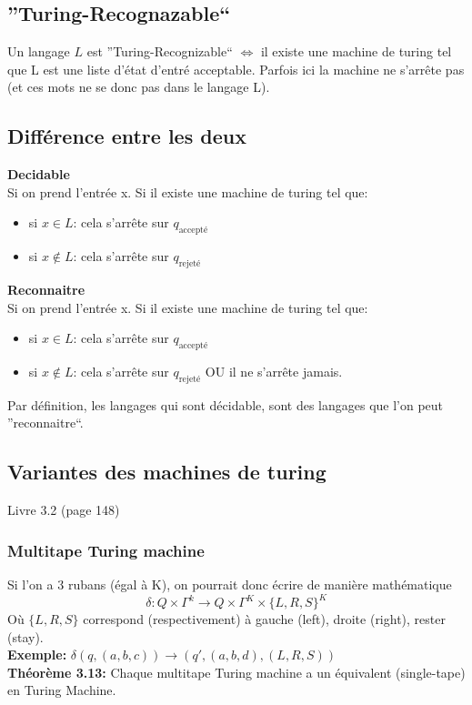 \documentclass[a4paper,12pt]{article}
\begin{document}
  \subsection{''Turing-Recognazable``}
    Un langage $L$ est ''Turing-Recognizable`` $\Leftrightarrow$ il existe une machine de turing tel que L est une liste d'état d'entré acceptable.  Parfois ici la machine ne s'arrête pas (et ces mots ne se donc pas dans le langage L).
    
  \subsection{Différence entre les deux}
    \textbf{Decidable}\\
    Si on prend l'entrée x.  Si il existe une machine de turing tel que:
    \begin{itemize}
      \item si $x \in L$:  cela s'arrête sur $q_{\text{accepté}}$
      \item si $x \notin L$:  cela s'arrête sur $q_{\text{rejeté}}$
    \end{itemize}

    \textbf{Reconnaitre}\\
    Si on prend l'entrée x.  Si il existe une machine de turing tel que:
    \begin{itemize}
      \item si $x \in L$:  cela s'arrête sur $q_{\text{accepté}}$
      \item si $x \notin L$:  cela s'arrête sur $q_{\text{rejeté}}$ OU il ne s'arrête jamais.
    \end{itemize}
    Par définition, les langages qui sont décidable, sont des langages que l'on peut ''reconnaitre``.
  
  \subsection{Variantes des machines de turing}
    Livre 3.2 (page 148)
  
    \subsubsection{Multitape Turing machine}
      Si l'on a 3 rubans (égal à K), on pourrait donc écrire de manière mathématique
      $$\delta : Q \times \Gamma^{k} \rightarrow Q \times \Gamma^K \times \{L, R, S\}^K$$
      Où $\{L, R, S\}$ correspond (respectivement) à gauche (left), droite (right), rester (stay).\\
      \textbf{Exemple: } $\delta(q, (a, b, c)) \rightarrow (q', (a, b, d), (L, R, S))$\\
      \textbf{Théorème 3.13:} Chaque multitape Turing machine a un équivalent (single-tape) en Turing Machine.
      
\end{document}
